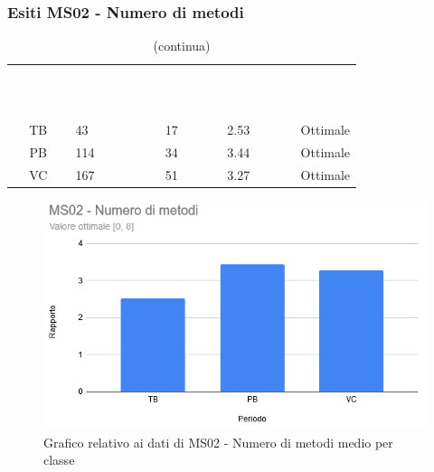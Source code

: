 \subsubsection{Esiti MS02 - Numero di metodi}
\begin{longtable}{c C{3cm} C{2cm} C{2cm} C{2cm}}
\caption{Esiti MS02 - Numero di metodi} \\
	\textcolor{white}{\textbf{Periodo}} &
	\textcolor{white}{\textbf{Tot\_metodi}} &
	\textcolor{white}{\textbf{\#Classi}} &
\textcolor{white}{\textbf{Rapporto}} &
\textcolor{white}{\textbf{Esito}} \\
	\endfirsthead
		\caption[]{(continua)} \\
		\textcolor{white}{\textbf{Periodo}} &
	\textcolor{white}{\textbf{Tot\_metodi}} &
	\textcolor{white}{\textbf{\#Classi}} &
\textcolor{white}{\textbf{Rapporto}} &
\textcolor{white}{\textbf{Esito}} \\
	\endhead
	TB & 43 & 17 & 2.53 & Ottimale \\
	PB & 114 & 34 & 3.44 & Ottimale \\
	VC & 167 & 51 & 3.27 & Ottimale \\
\end{longtable}

\begin{figure}[H]
\centering
\includegraphics[scale=0.7]{./img/MS02.png}
\caption{Grafico relativo ai dati di MS02 - Numero di metodi medio per classe}
\end{figure}

